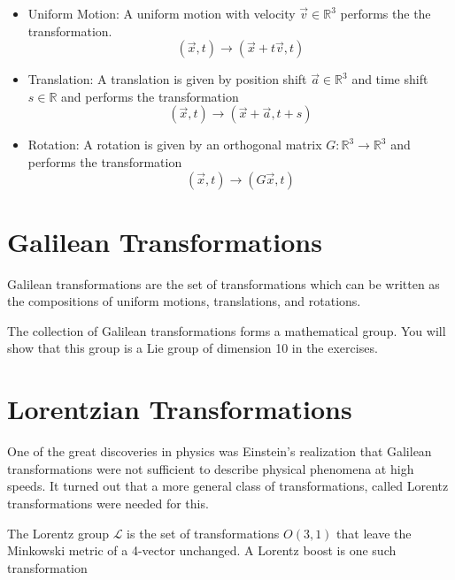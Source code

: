 \documentclass[book.tex]{subfiles}
\begin{document}


\begin{itemize}
    \item Uniform Motion: A uniform motion with velocity $\vec{v} \in \mathbb{R}^3$ performs the the transformation.
    \begin{equation}
        (\vec{x}, t) \to (\vec{x}+t\vec{v}, t)
    \end{equation}
    \item Translation: A translation is given by position shift $\vec{a} \in \mathbb{R}^3$ and time shift $s \in \mathbb{R}$ and performs the transformation
    \begin{equation}
        (\vec{x}, t) \to (\vec{x} + \vec{a}, t + s)
    \end{equation}
    \item Rotation: A rotation is given by an orthogonal matrix $G: \mathbb{R}^3 \to \mathbb{R}^3$ and performs the transformation
    \begin{equation}
        (\vec{x}, t) \to (G\vec{x}, t)
    \end{equation}
\end{itemize}

\section{Galilean Transformations}
Galilean transformations are the set of transformations which can be written as the compositions of uniform motions, translations, and rotations. 

The collection of Galilean transformations forms a mathematical group. You will show that this group is a Lie group of dimension 10 in the exercises.

\section{Lorentzian Transformations}
One of the great discoveries in physics was Einstein's realization that Galilean transformations were not sufficient to describe physical phenomena at high speeds. It turned out that a more general class of transformations, called Lorentz transformations were needed for this.

The Lorentz group $\mathcal{L}$ is the set of transformations $O(3, 1)$ that leave the Minkowski metric of a 4-vector unchanged. A Lorentz boost is one such transformation
\end{document}
